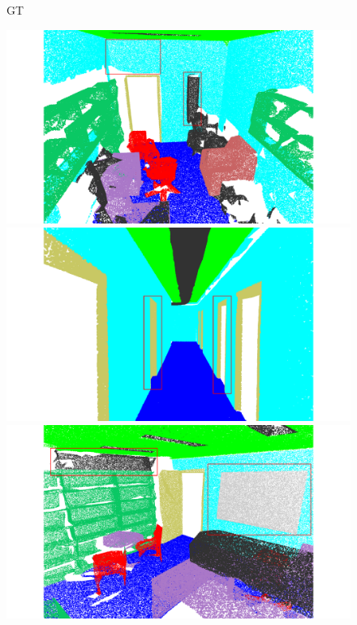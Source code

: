 \begin{figure}[htbp]
    \begin{minipage}{0.09\textwidth}
        \centering
        GT
    \end{minipage}
    \hfill
    \begin{minipage}{0.22\textwidth}
        \centering
        \includegraphics[width=\textwidth]{fig/supplement/semantic_segmentation/office_9/GT_office_9.pdf}
    \end{minipage}
    \hfill
    \begin{minipage}{0.22\textwidth}
        \centering
        \includegraphics[width=\textwidth]{fig/supplement/semantic_segmentation/hallway_10/GT_hallway_10.pdf}
    \end{minipage}
    \hfill
    \begin{minipage}{0.22\textwidth}
        \centering
        \includegraphics[width=\textwidth]{fig/supplement/semantic_segmentation/office_35/GT_office_35.pdf}

\end{minipage}
\end{figure}
